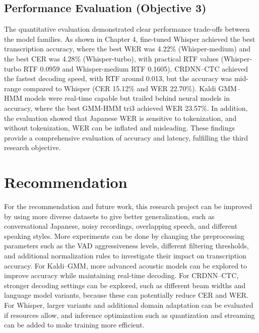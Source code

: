 \subsection{Performance Evaluation (Objective 3)}
The quantitative evaluation demonstrated clear performance trade-offs between the model families. As shown in Chapter 4, fine-tuned Whisper achieved the best transcription accuracy, where the best WER was 4.22\% (Whisper-medium) and the best CER was 4.28\% (Whisper-turbo), with practical RTF values (Whisper-turbo RTF 0.0959 and Whisper-medium RTF 0.1605). CRDNN--CTC achieved the fastest decoding speed, with RTF around 0.013, but the accuracy was mid-range compared to Whisper (CER 15.12\% and WER 22.70\%). Kaldi GMM--HMM models were real-time capable but trailed behind neural models in accuracy, where the best GMM-HMM tri3 achieved WER 23.57\%. In addition, the evaluation showed that Japanese WER is sensitive to tokenization, and without tokenization, WER can be inflated and misleading. These findings provide a comprehensive evaluation of accuracy and latency, fulfilling the third research objective.



\section{Recommendation}
For the recommendation and future work, this research project can be improved by using more diverse datasets to give better generalization, such as conversational Japanese, noisy recordings, overlapping speech, and different speaking styles. More experiments can be done by changing the preprocessing parameters such as the VAD aggressiveness levels, different filtering thresholds, and additional normalization rules to investigate their impact on transcription accuracy. For Kaldi--GMM, more advanced acoustic models can be explored to improve accuracy while maintaining real-time decoding. For CRDNN--CTC, stronger decoding settings can be explored, such as different beam widths and language model variants, because these can potentially reduce CER and WER. For Whisper, larger variants and additional domain adaptation can be evaluated if resources allow, and inference optimization such as quantization and streaming can be added to make training more efficient.


